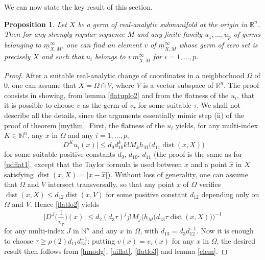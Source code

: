 \documentclass[a4paper]{amsart}
\theoremstyle{plain}
\newtheorem{prop}[subsubsection]{Proposition}
\theoremstyle{definition}
\theoremstyle{remark}
\DeclareMathOperator{\dist}{dist}
\newcommand{\imax}{\underline{m}}
\begin{document}
We can now state the key result of this section.

\begin{prop}\label{divis}
Let $ X $ be a germ of real-analytic submanifold at the
origin in $ \mathbb{R}^n $. 
Then for any strongly regular sequence $ M $ and any finite family
$ u_1,\dots,u_p $ of germs belonging to $ \imax^\infty_{X,M} $, one can find
an element $ v $ of $ \imax^\infty_{X,M} $ whose germ of zero set is precisely
$ X $ and such that
$ u_i $ belongs to $ v\,\imax^\infty_{X,M} $ for $ i=1,\dots,p $.
\end{prop}
\begin{proof} After a suitable real-analytic change of coordinates in a
neighborhood $ \Omega $ of $ 0 $, one can assume that $ X=\Omega\cap V $, where
$ V $ is a vector subspace of $ \mathbb{R}^n $. 
The proof consists in showing, from lemma \ref{flatuplo2} and from the flatness
of the $ u_i $, that it is possible to choose $ v $ as the germ of $ v_\tau $ for some
suitable $ \tau $. We shall not describe all the details, since the arguments essentially mimic step (ii) of the proof of theorem \ref{mythm}. First, the flatness of the $ u_i $ yields, for any multi-index $ K\in\mathbb{N}^n $, any $ x $ in $ \Omega $ and any $ i=1,\ldots,p $,
\begin{equation}\label{uiflat}
\vert D^Ku_i(x)\vert\leq d_9d_{10}^k k!M_kh_M\big(d_{11}\dist(x,X)\big)
\end{equation}
for some suitable positive constants $ d_9 $, $ d_{10} $, $ d_{11} $ (the proof is the same as for \eqref{udflat1}, except that the Taylor formula
is used between $ x $ and a point $ \hat{x} $ in $ X $ satisfying $ \dist(x,X)=\vert x-\hat{x}\vert $). Without loss of generality, one can assume that $ \Omega $ and $ V $ intersect transversally, so that any point $ x $ of $ \Omega $ verifies $ \dist(x,X)\leq d_{12}\dist(x,V) $ for some positive constant $ d_{12} $ depending only on $ \Omega $ and $ V $. Hence \eqref{flatlo2} yields 
\begin{equation}\label{flatlo3}
\Big\vert D^J\Big(\frac{1}{v_\tau}\Big)(x)\Big\vert \leq d_2(d_3\tau)^j j!M_j
\big(h_M\big(d_{13}\tau \dist(x,X)\big)\big)^{-1}
\end{equation} 
for any multi-index $ J $ in $ \mathbb{N}^n $ and any $ x $ in $ \Omega $, with $ d_{13}=d_3d_{12}^{-1} $. Now it is enough to choose $ \tau\geq\rho(2)d_{11}d_{13}^{-1} $: putting $ v(x)=v_\tau(x) $ for any $ x $ in
$ \Omega $, the desired result then follows from \eqref{hmodg}, \eqref{uiflat}, \eqref{flatlo3} and lemma \ref{elem}.
\end{proof}
\end{document}

